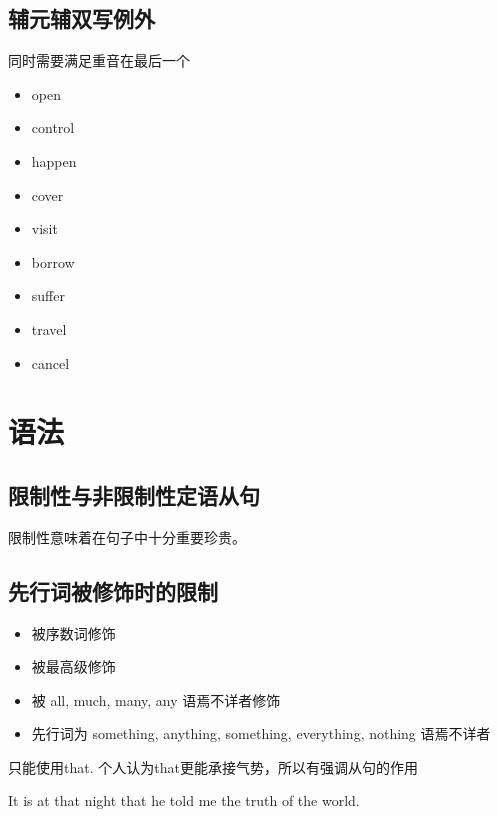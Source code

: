 \documentclass[utf8]{ctexart}
\begin{document}
\begin{enumerate}
			


		\subsection{辅元辅双写例外}
		同时需要满足重音在最后一个
		\begin{itemize}
				\item open
				\item control	
				\item happen
				\item cover
				\item visit
				\item borrow
				\item suffer
				\item travel
				\item cancel			
						
		\end{itemize}
		

		\end{enumerate}
		\section{语法}
		\subsection{限制性与非限制性定语从句}
		\Large 限制性意味着在句子中十分重要珍贵。
		\subsection{先行词被修饰时的限制}
		\begin{itemize}
				\item 被序数词修饰
				\item 被最高级修饰
				\item 被 all, much, many, any 语焉不详者修饰
				\item 先行词为 something, anything, something, everything, nothing 语焉不详者			
		\end{itemize}
		\Large 只能使用that. 个人认为that更能承接气势，所以有强调从句的作用
        \par It is at that night that he told me the truth of the world.
		
		
		
		
\end{document}
